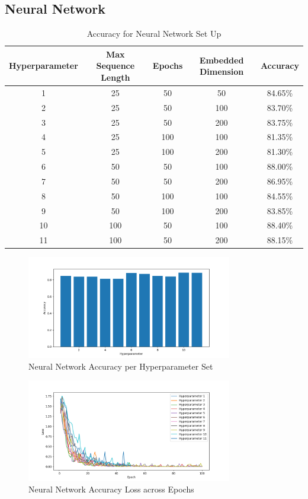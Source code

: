 \subsection{Neural Network}

\begin{table}[H]
\begin{center}
\begin{tabular}{||c|c|c|c|c||}
    \hline
    Hyperparameter & Max Sequence Length & Epochs & Embedded Dimension & Accuracy \\
    \hline
    1 & 25 & 50 & 50 & 84.65\% \\
    2 & 25 & 50 & 100 & 83.70\% \\
    3 & 25 & 50 & 200 & 83.75\% \\
    4 & 25 & 100 & 100 & 81.35\% \\
    5 & 25 & 100 & 200 & 81.30\% \\
    6 & 50 & 50 & 100 & 88.00\% \\
    7 & 50 & 50 & 200 & 86.95\% \\
    8 & 50 & 100 & 100 & 84.55\% \\
    9 & 50 & 100 & 200 & 83.85\% \\
    10 & 100 & 50 & 100 & 88.40\% \\
    11 & 100 & 50 & 200 & 88.15\% \\
    \hline
\end{tabular}
\caption[Neural Network Results]{Accuracy for Neural Network Set Up}
\label{tab:nn-results}
\end{center}
\end{table}

\begin{figure}[H]
    \centering
    \includegraphics*[width=0.8\textwidth]{images/acc-bar-nn.png}
    \caption{Neural Network Accuracy per Hyperparameter Set}
    \label{fig:nn-results}
\end{figure}

\begin{figure}[H]
    \centering
    \includegraphics*[width=0.8\textwidth]{images/loss-nn.png}
    \caption{Neural Network Accuracy Loss across Epochs}
    \label{fig:nn-results-2}
\end{figure}

